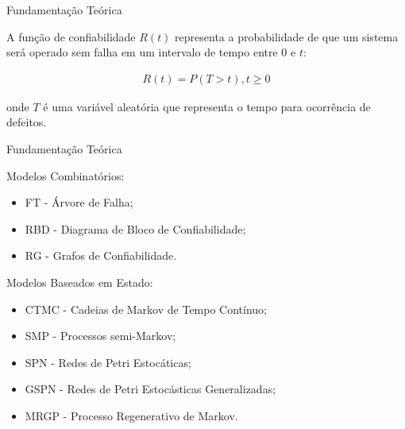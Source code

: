 \documentclass{beamer}
\begin{document}
    \begin{frame}{Fundamentação Teórica}
    
        A função de confiabilidade $R(t)$ representa a probabilidade de que um sistema será operado sem falha em um intervalo de tempo entre 0 e $t$:
        
        \begin{align*}
            R(t) = P(T > t), t \ge 0
        \end{align*}
        
        onde $T$ é uma variável aleatória que representa o tempo para ocorrência de defeitos.
    
    \end{frame}
    
    \begin{frame}{Fundamentação Teórica}
    
        Modelos Combinatórios:

        \begin{itemize}
            \item FT - Árvore de Falha;
            \item RBD - Diagrama de Bloco de Confiabilidade;
            \item RG - Grafos de Confiabilidade.
        \end{itemize}
		
		\medskip \medskip
        
        Modelos Baseados em Estado:

        \begin{itemize}
            \item CTMC - Cadeias de Markov de Tempo Contínuo;
            \item SMP - Processos semi-Markov;
            \item SPN - Redes de Petri Estocáticas;
            \item GSPN - Redes de Petri Estocásticas Generalizadas;
            \item MRGP - Processo Regenerativo de Markov.
        \end{itemize}

    \end{frame}
    
\end{document}
